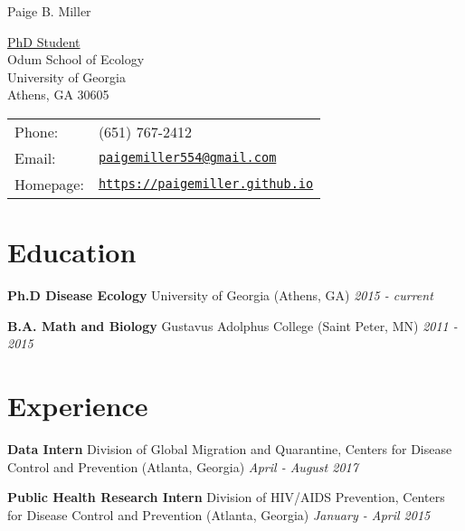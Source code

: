 \documentclass[letterpaper]{article}
\def\name{Paige B. Miller}
\renewenvironment{itemize}{
  \begin{list}{}{
    \setlength{\leftmargin}{1.5em}
  }
}{
  \end{list}
}
\begin{document}
{\huge \name}


\vspace{0.25in}

\begin{minipage}{0.45\linewidth}
  \href{}{PhD Student} \\
  Odum School of Ecology \\
  University of Georgia \\
  Athens, GA 30605
\end{minipage}
\begin{minipage}{0.45\linewidth}
  \begin{tabular}{ll}
    Phone: & (651) 767-2412 \\
    Email: & \href{mailto:paige.miller@uga.edu}{\tt paigemiller554@gmail.com} \\
    Homepage: & \href{https://paigemiller.github.io}{\tt https://paigemiller.github.io} \\
  \end{tabular}
\end{minipage}

\section*{Education}

\begin{itemize}
  \item \textbf{Ph.D Disease Ecology} University of Georgia (Athens, GA) 	\hfill \textit{2015 - current}
  \item \textbf{B.A. Math and Biology} Gustavus Adolphus College (Saint Peter, MN) \hfill  \textit{2011 - 2015}
\end{itemize}

\section*{Experience}

\begin{itemize}
  \item  \textbf{Data Intern} Division of Global Migration and Quarantine, Centers for Disease Control and Prevention (Atlanta, Georgia)
   \hfill  \textit{April - August 2017}
  \item  \textbf{Public Health Research Intern} Division of HIV/AIDS Prevention, Centers for Disease Control and Prevention (Atlanta, Georgia)
  \hfill  \textit{January - April 2015}
\end{itemize}
\end{document}
